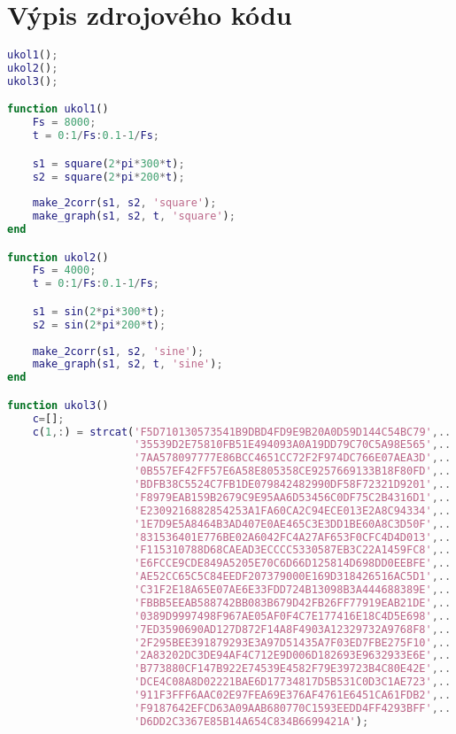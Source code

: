 \documentclass[11pt, a4paper]{article}
\begin{document}
    
    \section{Výpis zdrojového kódu}
    
\begin{lstlisting}[language=matlab, frame=single] 
ukol1();
ukol2();
ukol3();

function ukol1()
    Fs = 8000;
    t = 0:1/Fs:0.1-1/Fs;

    s1 = square(2*pi*300*t);
    s2 = square(2*pi*200*t);
    
    make_2corr(s1, s2, 'square');
    make_graph(s1, s2, t, 'square');
end

function ukol2()
    Fs = 4000;
    t = 0:1/Fs:0.1-1/Fs;

    s1 = sin(2*pi*300*t);
    s2 = sin(2*pi*200*t);
    
    make_2corr(s1, s2, 'sine');
    make_graph(s1, s2, t, 'sine');
end

function ukol3()
    c=[];
    c(1,:) = strcat('F5D710130573541B9DBD4FD9E9B20A0D59D144C54BC79',...
                    '35539D2E75810FB51E494093A0A19DD79C70C5A98E565',...
                    '7AA578097777E86BCC4651CC72F2F974DC766E07AEA3D',...
                    '0B557EF42FF57E6A58E805358CE9257669133B18F80FD',...
                    'BDFB38C5524C7FB1DE079842482990DF58F72321D9201',...
                    'F8979EAB159B2679C9E95AA6D53456C0DF75C2B4316D1',...
                    'E2309216882854253A1FA60CA2C94ECE013E2A8C94334',...
                    '1E7D9E5A8464B3AD407E0AE465C3E3DD1BE60A8C3D50F',...
                    '831536401E776BE02A6042FC4A27AF653F0CFC4D4D013',...
                    'F115310788D68CAEAD3ECCCC5330587EB3C22A1459FC8',...
                    'E6FCCE9CDE849A5205E70C6D66D125814D698DD0EEBFE',...
                    'AE52CC65C5C84EEDF207379000E169D318426516AC5D1',...
                    'C31F2E18A65E07AE6E33FDD724B13098B3A444688389E',...
                    'FBBB5EEAB588742BB083B679D42FB26FF77919EAB21DE',...
                    '0389D9997498F967AE05AF0F4C7E177416E18C4D5E698',...
                    '7ED3590690AD127D872F14A8F4903A12329732A9768F8',...
                    '2F295BEE391879293E3A97D51435A7F03ED7FBE275F10',...
                    '2A83202DC3DE94AF4C712E9D006D182693E9632933E6E',...
                    'B773880CF147B922E74539E4582F79E39723B4C80E42E',...
                    'DCE4C08A8D02221BAE6D17734817D5B531C0D3C1AE723',...
                    '911F3FFF6AAC02E97FEA69E376AF4761E6451CA61FDB2',...
                    'F9187642EFCD63A09AAB680770C1593EEDD4FF4293BFF',...
                    'D6DD2C3367E85B14A654C834B6699421A');


\end{lstlisting}
\end{document}
